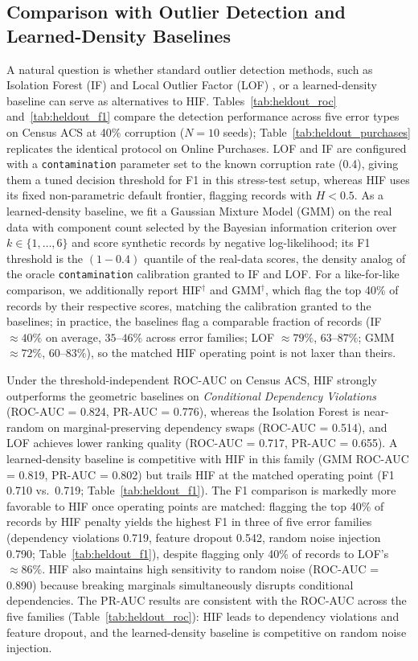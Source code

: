 \documentclass[pdflatex,sn-mathphys-num]{sn-jnl}
\theoremstyle{thmstyleone}%
\theoremstyle{thmstyletwo}%
\theoremstyle{thmstylethree}%
\begin{document}
\subsection{Comparison with Outlier Detection and Learned-Density Baselines}\label{sec:heldout}

A natural question is whether standard outlier detection methods, such as Isolation Forest (IF) \cite{liu2008isolation} and Local Outlier Factor (LOF) \cite{breunig2000lof}, or a learned-density baseline can serve as alternatives to HIF. Tables~\ref{tab:heldout_roc} and~\ref{tab:heldout_f1} compare the detection performance across five error types on Census ACS at 40\% corruption ($N=10$ seeds); Table~\ref{tab:heldout_purchases} replicates the identical protocol on Online Purchases. LOF and IF are configured with a \texttt{contamination} parameter set to the known corruption rate (0.4), giving them a tuned decision threshold for F1 in this stress-test setup, whereas HIF uses its fixed non-parametric default frontier, flagging records with $H < 0.5$. As a learned-density baseline, we fit a Gaussian Mixture Model (GMM) on the real data with component count selected by the Bayesian information criterion \cite{schwarz1978estimating} over $k \in \{1, \ldots, 6\}$ and score synthetic records by negative log-likelihood; its F1 threshold is the $(1-0.4)$ quantile of the real-data scores, the density analog of the oracle \texttt{contamination} calibration granted to IF and LOF. For a like-for-like comparison, we additionally report HIF$^{\dagger}$ and GMM$^{\dagger}$, which flag the top 40\% of records by their respective scores, matching the calibration granted to the baselines; in practice, the baselines flag a comparable fraction of records (IF $\approx 40\%$ on average, $35$--$46\%$ across error families; LOF $\approx 79\%$, $63$--$87\%$; GMM $\approx 72\%$, $60$--$83\%$), so the matched HIF operating point is not laxer than theirs.

Under the threshold-independent ROC-AUC on Census ACS, HIF strongly outperforms the geometric baselines on \textit{Conditional Dependency Violations} (ROC-AUC = 0.824, PR-AUC = 0.776), whereas the Isolation Forest is near-random on marginal-preserving dependency swaps (ROC-AUC = 0.514), and LOF achieves lower ranking quality (ROC-AUC = 0.717, PR-AUC = 0.655). A learned-density baseline is competitive with HIF in this family (GMM ROC-AUC = 0.819, PR-AUC = 0.802) but trails HIF at the matched operating point (F1 0.710 vs.\ 0.719; Table~\ref{tab:heldout_f1}). The F1 comparison is markedly more favorable to HIF once operating points are matched: flagging the top 40\% of records by HIF penalty yields the highest F1 in three of five error families (dependency violations 0.719, feature dropout 0.542, random noise injection 0.790; Table~\ref{tab:heldout_f1}), despite flagging only 40\% of records to LOF's $\approx 86\%$. HIF also maintains high sensitivity to random noise (ROC-AUC = 0.890) because breaking marginals simultaneously disrupts conditional dependencies. The PR-AUC results are consistent with the ROC-AUC across the five families (Table~\ref{tab:heldout_roc}): HIF leads to dependency violations and feature dropout, and the learned-density baseline is competitive on random noise injection.
\end{document}
